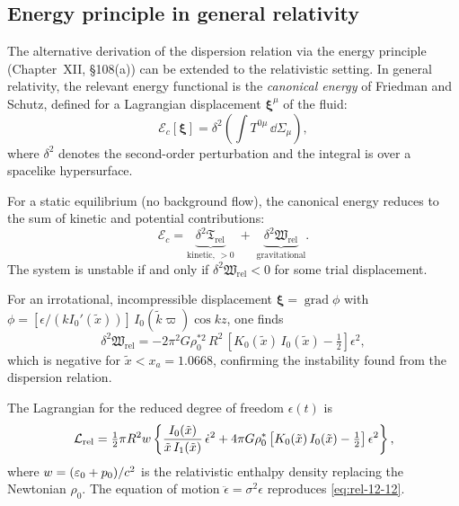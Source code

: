 \subsection{Energy principle in general relativity}
\label{sec:rel-12-108e}

The alternative derivation of the dispersion relation via the energy
principle (Chapter~XII, \S108(a)) can be extended to the relativistic
setting.  In general relativity, the relevant energy functional is the
\emph{canonical energy} of Friedman and Schutz, defined for a
Lagrangian displacement $\boldsymbol{\xi}^{\mu}$ of the fluid:
\begin{equation}
\label{eq:rel-12-22}
\mathcal{E}_{c}[\boldsymbol{\xi}]
  = \delta^{2}\!\left(\int T^{0\mu}\,\dd\Sigma_{\mu}\right),
\end{equation}
where $\delta^{2}$ denotes the second-order perturbation and the
integral is over a spacelike hypersurface.

For a static equilibrium (no background flow), the canonical energy
reduces to the sum of kinetic and potential contributions:
\begin{equation}
\label{eq:rel-12-23}
\mathcal{E}_{c} = \underbrace{\delta^{2}\mathfrak{T}_{\mathrm{rel}}}_{\text{kinetic, }>0}
  \;+\; \underbrace{\delta^{2}\mathfrak{W}_{\mathrm{rel}}}_{\text{gravitational}}.
\end{equation}
The system is unstable if and only if
$\delta^{2}\mathfrak{W}_{\mathrm{rel}} < 0$ for some trial
displacement.

For an irrotational, incompressible displacement
$\boldsymbol{\xi} = \operatorname{grad}\phi$ with
$\phi = [\epsilon/(kI_{0}'(\tilde{x}))]\,I_{0}(\tilde{k}\varpi)\cos kz$,
one finds
\begin{equation}
\label{eq:rel-12-24}
\delta^{2}\mathfrak{W}_{\mathrm{rel}}
  = -2\pi^{2}G\rho_{0}^{*2}\,R^{2}\,
  \left[K_{0}(\tilde{x})\,I_{0}(\tilde{x}) - \tfrac{1}{2}\right]\epsilon^{2},
\end{equation}
which is negative for $\tilde{x}<x_{a}=1.0668$, confirming the
instability found from the dispersion relation.

The Lagrangian for the reduced degree of freedom $\epsilon(t)$ is
\begin{equation}
\label{eq:rel-12-25}
\mathcal{L}_{\mathrm{rel}} = \tfrac{1}{2}\pi R^{2}w
  \left\{\frac{I_{0}(\tilde{x})}{\tilde{x}\,I_{1}(\tilde{x})}
  \,\dot{\epsilon}^{2}
  + 4\pi G\rho_{0}^{*}
  \left[K_{0}(\tilde{x})\,I_{0}(\tilde{x})-\tfrac{1}{2}\right]
  \epsilon^{2}\right\},
\end{equation}
where $w = (\varepsilon_{0}+p_{0})/c^{2}$ is the relativistic
enthalpy density replacing the Newtonian $\rho_{0}$.  The equation of
motion $\ddot{\epsilon}=\sigma^{2}\epsilon$ reproduces
\eqref{eq:rel-12-12}.

